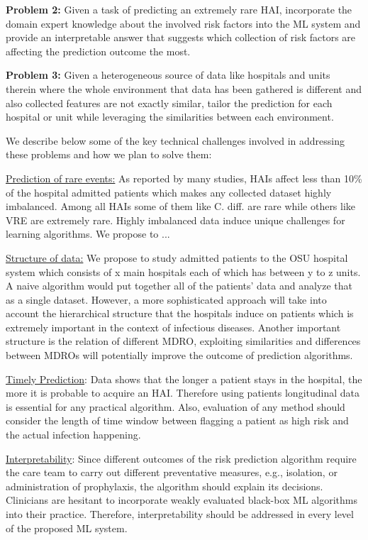 {\noindent \bf Problem 2:} Given a task of predicting an extremely rare HAI, incorporate the domain expert knowledge about the involved risk factors into the ML system and provide an interpretable answer that suggests which collection of risk factors are affecting the prediction outcome the most.

{\noindent \bf Problem 3:} Given a heterogeneous source of data like hospitals and units therein where the whole environment that data has been gathered is different and also collected features are not exactly similar, tailor the prediction for each hospital or unit while leveraging the similarities between each environment.

We describe below some of the key technical challenges involved in addressing these problems and how we plan to solve them:

\underline{Prediction of rare events:} As reported by many studies, HAIs affect less than 10\% of the hospital admitted patients which makes any collected dataset highly imbalanced. Among all HAIs some of them like C. diff. are rare while others like VRE are extremely rare. Highly imbalanced data induce unique challenges for learning algorithms. We propose to ...

\underline{Structure of data:} We propose to study admitted patients to the OSU hospital system which consists of x main hospitals each of which has between y to z units. A naive algorithm would put together all of the patients' data and analyze that as a single dataset. However, a more sophisticated approach will take into account the hierarchical structure that the hospitals induce on patients which is extremely important in the context of infectious diseases. Another important structure is the relation of different MDRO, exploiting similarities and differences between MDROs will potentially improve the outcome of prediction algorithms.

\underline{Timely Prediction}: Data shows that the longer a patient stays in the hospital, the more it is probable to acquire an HAI. Therefore using patients longitudinal data is essential for any practical algorithm. Also, evaluation of any method should consider the length of time window between flagging a patient as high risk and the actual infection happening.

\underline{Interpretability}: Since different outcomes of the risk prediction algorithm require the care team to carry out different preventative measures, e.g., isolation, or administration of prophylaxis, the algorithm should explain its decisions. Clinicians are hesitant to incorporate weakly evaluated black-box ML algorithms into their practice. Therefore, interpretability should be addressed in every level of the proposed ML system.

